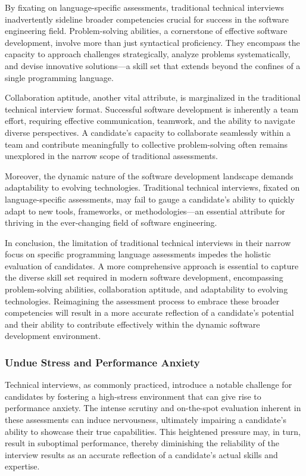 \documentclass[
    a4paper, %
    10pt, %
    unnumberedsections, %
    twoside, %
]{LTJournalArticle}
\begin{document}
By fixating on language-specific assessments, traditional technical interviews inadvertently sideline broader competencies crucial for success in the software engineering field. Problem-solving abilities, a cornerstone of effective software development, involve more than just syntactical proficiency. They encompass the capacity to approach challenges strategically, analyze problems systematically, and devise innovative solutions—a skill set that extends beyond the confines of a single programming language.

Collaboration aptitude, another vital attribute, is marginalized in the traditional technical interview format. Successful software development is inherently a team effort, requiring effective communication, teamwork, and the ability to navigate diverse perspectives. A candidate's capacity to collaborate seamlessly within a team and contribute meaningfully to collective problem-solving often remains unexplored in the narrow scope of traditional assessments.

Moreover, the dynamic nature of the software development landscape demands adaptability to evolving technologies. Traditional technical interviews, fixated on language-specific assessments, may fail to gauge a candidate's ability to quickly adapt to new tools, frameworks, or methodologies—an essential attribute for thriving in the ever-changing field of software engineering.

In conclusion, the limitation of traditional technical interviews in their narrow focus on specific programming language assessments impedes the holistic evaluation of candidates. A more comprehensive approach is essential to capture the diverse skill set required in modern software development, encompassing problem-solving abilities, collaboration aptitude, and adaptability to evolving technologies. Reimagining the assessment process to embrace these broader competencies will result in a more accurate reflection of a candidate's potential and their ability to contribute effectively within the dynamic software development environment.

\subsubsection*{Undue Stress and Performance Anxiety}

Technical interviews, as commonly practiced, introduce a notable challenge for candidates by fostering a high-stress environment that can give rise to performance anxiety. The intense scrutiny and on-the-spot evaluation inherent in these assessments can induce nervousness, ultimately impairing a candidate's ability to showcase their true capabilities. This heightened pressure may, in turn, result in suboptimal performance, thereby diminishing the reliability of the interview results as an accurate reflection of a candidate's actual skills and expertise.
\end{document}
